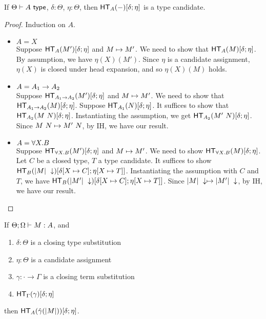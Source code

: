 \documentclass{article}
\begin{document}
\begin{lemma}\label{lem:head_exp}
If $\Theta \vdash A\ \mathsf{type}$, $\delta : \Theta$, $\eta : \Theta$, then $\mathsf{HT}_{A}(-)[\delta;\eta]$ is a type candidate.
\end{lemma}
\begin{proof}
Induction on $A$.
\begin{itemize}
\setlength\itemsep{1em}
\item $A = X$\\
Suppose $\mathsf{HT}_{A}(M')[\delta;\eta]$ and $M \mapsto M'$. We need to show that $\mathsf{HT}_{A}(M)[\delta;\eta]$.
By assumption, we have $\eta(X)(M')$. Since $\eta$ is a candidate assignment, $\eta(X)$ is closed under head expansion,
and so $\eta(X)(M)$ holds.
\item $A = A_1 \to A_2$\\
Suppose $\mathsf{HT}_{A_1 \to A_2}(M')[\delta;\eta]$ and $M \mapsto M'$.
We need to show that $\mathsf{HT}_{A_1 \to A_2}(M)[\delta;\eta]$. Suppose $\mathsf{HT}_{A_1}(N)[\delta;\eta]$.
It suffices to show that $\mathsf{HT}_{A_2}(M\ N)[\delta;\eta]$. Instantiating the assumption, we get
$\mathsf{HT}_{A_2}(M'\ N)[\delta;\eta]$. Since $M\ N \mapsto M'\ N$, by IH, we have our result.
\item $A = \forall X. B$\\
Suppose $\mathsf{HT}_{\forall X. B}(M')[\delta;\eta]$ and $M \mapsto M'$.
We need to show $\mathsf{HT}_{\forall X. B}(M)[\delta;\eta]$. Let $C$ be a closed type, $T$ a type candidate.
It suffices to show $\mathsf{HT}_{B}(|M|\ \downarrow)[\delta[X \mapsto C];\eta[X \mapsto T]]$.
Instantiating the assumption with $C$ and $T$, we have
$\mathsf{HT}_{B}(|M'|\ \downarrow)[\delta[X \mapsto C];\eta[X \mapsto T]]$.
Since $|M|\ \downarrow \mapsto |M'|\ \downarrow$, by IH, we have our result.
\end{itemize}
\end{proof}

\begin{theorem}
If $\Theta;\Omega \vdash M : A$, and
\begin{enumerate}
\item $\delta : \Theta$ is a closing type substitution
\item $\eta : \Theta$ is a candidate assignment
\item $\gamma : \cdot \to \Gamma$ is a closing term substitution
\item $\mathsf{HT}_{\Gamma}(\gamma)[\delta;\eta]$
\end{enumerate}
then $\mathsf{HT}_{A}(\hat\gamma(|M|))[\delta;\eta]$.
\end{theorem}
\end{document}
